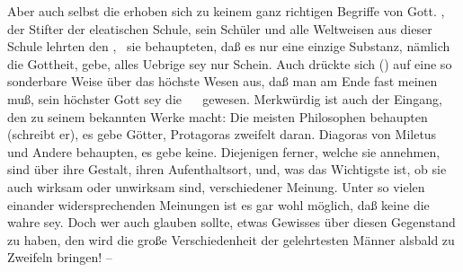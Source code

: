 \begin{aufza}
\item Aber auch selbst die  erhoben sich zu keinem ganz richtigen Begriffe von Gott. , der Stifter der eleatischen Schule, sein Schüler  und alle Weltweisen aus dieser Schule lehrten den , \dh\ sie behaupteten, daß es nur eine einzige Substanz, nämlich die Gottheit, gebe, alles Uebrige sey nur Schein. Auch  drückte sich () auf eine so sonderbare Weise über das höchste Wesen aus, daß man am Ende fast meinen muß, sein höchster Gott sey die ~\  gewesen. Merkwürdig ist auch der Eingang, den  zu seinem bekannten Werke  macht: Die meisten Philosophen behaupten (schreibt er), es gebe Götter, Protagoras zweifelt daran. Diagoras von Miletus und Andere behaupten, es gebe keine. Diejenigen ferner, welche sie annehmen, sind über ihre Gestalt, ihren Aufenthaltsort, und, was das Wichtigste ist, ob sie auch wirksam oder unwirksam sind, verschiedener Meinung. Unter so vielen einander widersprechenden Meinungen ist es gar wohl möglich, daß keine die wahre sey. Doch wer auch glauben sollte, etwas Gewisses über diesen Gegenstand zu haben, den wird die große Verschiedenheit der gelehrtesten Männer alsbald zu Zweifeln bringen! --

\end{aufza}
